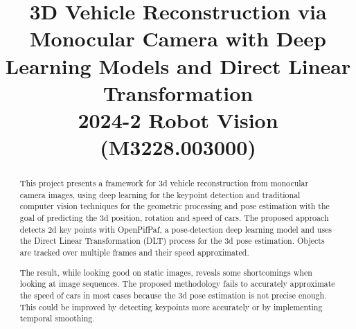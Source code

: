 \documentclass[conference]{IEEEtran}
\begin{document}
\setcounter{MaxMatrixCols}{20}
\pagestyle{plain}

\title{3D Vehicle Reconstruction via Monocular Camera with Deep Learning Models and Direct Linear Transformation\\
{\footnotesize 2024-2 Robot Vision (M3228.003000)}
}

\author{
    \and
    \and
}

\maketitle

\begin{abstract}
    This project presents a framework for 3d vehicle reconstruction from monocular camera images, using deep learning for the keypoint detection and traditional computer vision techniques for the geometric processing and pose estimation with the goal of predicting the 3d position, rotation and speed of cars. The proposed approach detects 2d key points with OpenPifPaf, a pose-detection deep learning model and uses the Direct Linear Transformation (DLT) process for the 3d pose estimation. Objects are tracked over multiple frames and their speed approximated. 
    
    The result, while looking good on static images, reveals some shortcomings when looking at image sequences. The proposed methodology fails to accurately approximate the speed of cars in most cases because the 3d pose estimation is not precise enough. This could be improved by detecting keypoints more accurately or by implementing temporal smoothing.     
\end{abstract}
\end{document}

